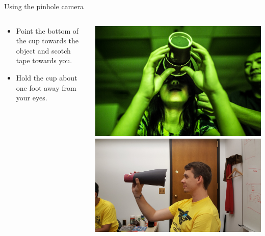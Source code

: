 \begin{frame}{Using the pinhole camera}
  \begin{columns}
    \begin{column}{0.6\textwidth}
      \begin{itemize}
        \item
          Point the bottom of the cup towards the object and scotch tape towards you.\\
        \item
          Hold the cup about one foot away from your eyes.
      \end{itemize}
    \end{column}
    \begin{column}{0.4\textwidth}
      \includegraphics[width=\textwidth]{media/replace_parker_image.jpg}\\
      \includegraphics[width=\textwidth,trim=3in 0 3in 0,clip]{media/how-to-use-pinhole-campera.jpg}
    \end{column}
  \end{columns}
\end{frame}

